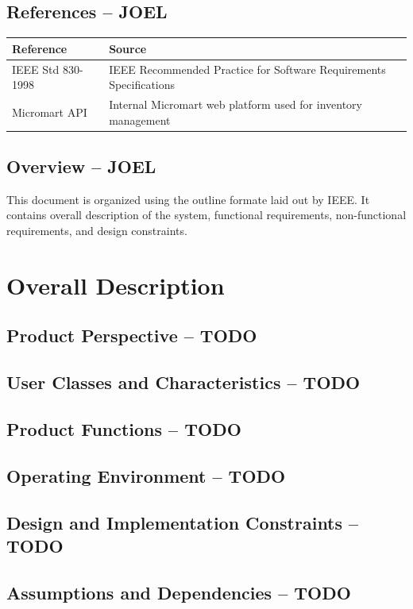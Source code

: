 \documentclass{scrreprt}
\begin{document}
\section{References -- JOEL}
\begin{tabular}{|p{4cm}|p{10cm}|}
\hline
\textbf{Reference} & \textbf{Source} \\
\hline
IEEE Std 830-1998 & IEEE Recommended Practice for Software Requirements Specifications \\
\hline
Micromart API & Internal Micromart web platform used for inventory management \\
\hline
\end{tabular}
\section{Overview -- JOEL}
This document is organized using the outline formate laid out by IEEE. It contains overall description of the system, functional requirements, non-functional requirements, and design constraints.

\chapter{Overall Description}

\section{Product Perspective -- TODO}

\section{User Classes and Characteristics -- TODO}

\section{Product Functions -- TODO}

\section{Operating Environment -- TODO}

\section{Design and Implementation Constraints -- TODO}

\section{Assumptions and Dependencies -- TODO}
\end{document}
